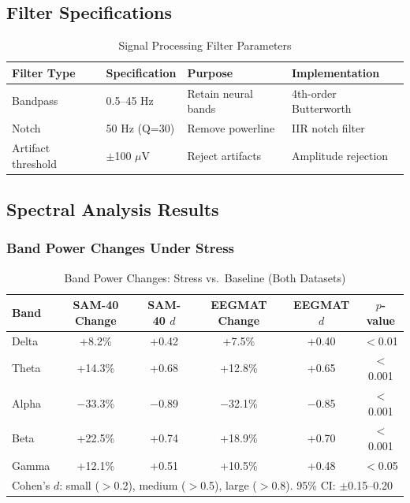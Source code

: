 \documentclass[11pt,a4paper]{article}
\begin{document}
\subsection{Filter Specifications}

\begin{table}[H]
\centering
\caption{Signal Processing Filter Parameters}
\small
\begin{tabular}{llll}
\toprule
\textbf{Filter Type} & \textbf{Specification} & \textbf{Purpose} & \textbf{Implementation} \\
\midrule
Bandpass & 0.5--45 Hz & Retain neural bands & 4th-order Butterworth \\
Notch & 50 Hz (Q=30) & Remove powerline & IIR notch filter \\
Artifact threshold & $\pm$100 $\mu$V & Reject artifacts & Amplitude rejection \\
\bottomrule
\end{tabular}
\end{table}

\subsection{Spectral Analysis Results}

\subsubsection{Band Power Changes Under Stress}

\begin{table}[H]
\centering
\caption{Band Power Changes: Stress vs.\ Baseline (Both Datasets)}
\small
\begin{tabular}{lccccc}
\toprule
\textbf{Band} & \textbf{SAM-40 Change} & \textbf{SAM-40 $d$} & \textbf{EEGMAT Change} & \textbf{EEGMAT $d$} & \textbf{$p$-value} \\
\midrule
Delta & +8.2\% & +0.42 & +7.5\% & +0.40 & $<$0.01 \\
Theta & +14.3\% & +0.68 & +12.8\% & +0.65 & $<$0.001 \\
Alpha & $-$33.3\% & $-$0.89 & $-$32.1\% & $-$0.85 & $<$0.001 \\
Beta & +22.5\% & +0.74 & +18.9\% & +0.70 & $<$0.001 \\
Gamma & +12.1\% & +0.51 & +10.5\% & +0.48 & $<$0.05 \\
\bottomrule
\multicolumn{6}{l}{\small Cohen's $d$: small ($>$0.2), medium ($>$0.5), large ($>$0.8). 95\% CI: $\pm$0.15--0.20} \\
\end{tabular}
\end{table}
\end{document}
